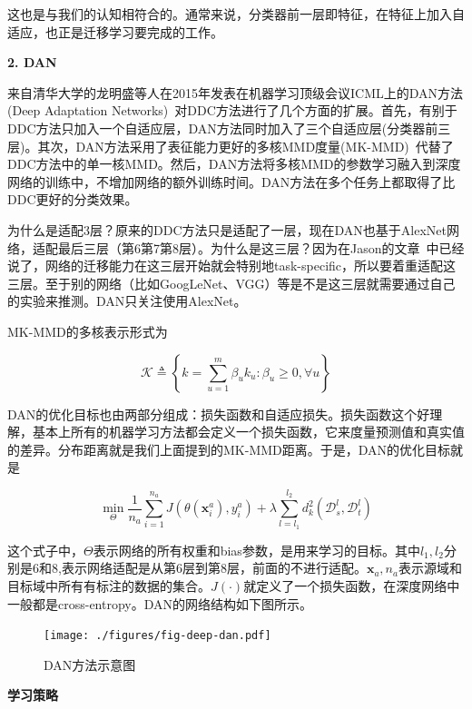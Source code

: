 这也是与我们的认知相符合的。通常来说，分类器前一层即特征，在特征上加入自适应，也正是迁移学习要完成的工作。

\textbf{2. DAN}

来自清华大学的龙明盛等人在2015年发表在机器学习顶级会议ICML上的DAN方法(Deep Adaptation Networks)~\cite{long2015learning}对DDC方法进行了几个方面的扩展。首先，有别于DDC方法只加入一个自适应层，DAN方法同时加入了三个自适应层(分类器前三层)。其次，DAN方法采用了表征能力更好的多核MMD度量(MK-MMD)~\cite{gretton2012optimal}代替了DDC方法中的单一核MMD。然后，DAN方法将多核MMD的参数学习融入到深度网络的训练中，不增加网络的额外训练时间。DAN方法在多个任务上都取得了比DDC更好的分类效果。

为什么是适配3层？原来的DDC方法只是适配了一层，现在DAN也基于AlexNet网络，适配最后三层（第6第7第8层）。为什么是这三层？因为在Jason的文章~\cite{yosinski2014transferable}中已经说了，网络的迁移能力在这三层开始就会特别地task-specific，所以要着重适配这三层。至于别的网络（比如GoogLeNet、VGG）等是不是这三层就需要通过自己的实验来推测。DAN只关注使用AlexNet。

MK-MMD的多核表示形式为

\begin{equation}
	\mathcal{K} \triangleq \left\{k= \sum_{u=1}^{m}\beta_u k_u : \beta_u \ge 0, \forall u \right\}
\end{equation}

DAN的优化目标也由两部分组成：损失函数和自适应损失。损失函数这个好理解，基本上所有的机器学习方法都会定义一个损失函数，它来度量预测值和真实值的差异。分布距离就是我们上面提到的MK-MMD距离。于是，DAN的优化目标就是

\begin{equation}
	\label{eq-deep-dan}
	\min_\Theta \frac{1}{n_a} \sum_{i=1}^{n_a} J(\theta(\mathbf{x}^a_i),y^a_i) + \lambda \sum_{l=l_1}^{l_2}d^2_k(\mathcal{D}^l_s,\mathcal{D}^l_t)
\end{equation}

这个式子中，$\Theta$表示网络的所有权重和bias参数，是用来学习的目标。其中$l_1,l_2$分别是6和8,表示网络适配是从第6层到第8层，前面的不进行适配。$\mathbf{x}_a,n_a$表示源域和目标域中所有有标注的数据的集合。$J(\cdot)$就定义了一个损失函数，在深度网络中一般都是cross-entropy。DAN的网络结构如下图所示。

\begin{figure}[htbp]
	\centering
	\texttt{[image: ./figures/fig-deep-dan.pdf]}
	\caption{DAN方法示意图}
	\label{fig-deep-dan}
\end{figure}

\textbf{学习策略}

